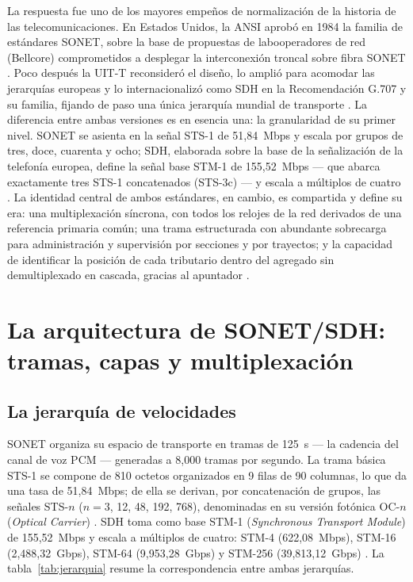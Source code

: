 \documentclass[12pt,a4paper]{article}
\begin{document}
La respuesta fue uno de los mayores empeños de normalización de la historia de las telecomunicaciones. En Estados Unidos, la ANSI aprobó en 1984 la familia de estándares SONET, sobre la base de propuestas de labooperadores de red (Bellcore) comprometidos a desplegar la interconexión troncal sobre fibra SONET \cite{ansi}. Poco después la UIT-T reconsideró el diseño, lo amplió para acomodar las jerarquías europeas y lo internacionalizó como SDH en la Recomendación G.707 y su familia, fijando de paso una única jerarquía mundial de transporte \cite{itug707}. La diferencia entre ambas versiones es en esencia una: la granularidad de su primer nivel. SONET se asienta en la señal STS-1 de 51{,}84~Mbps y escala por grupos de tres, doce, cuarenta y ocho; SDH, elaborada sobre la base de la señalización de la telefonía europea, define la señal base STM-1 de 155{,}52~Mbps --- que abarca exactamente tres STS-1 concatenados (STS-3c) --- y escala a múltiplos de cuatro \cite{itug707, stallings2004}. La identidad central de ambos estándares, en cambio, es compartida y define su era: una multiplexación síncrona, con todos los relojes de la red derivados de una referencia primaria común; una trama estructurada con abundante sobrecarga para administración y supervisión por secciones y por trayectos; y la capacidad de identificar la posición de cada tributario dentro del agregado sin demultiplexado en cascada, gracias al apuntador \cite{itug707, ituG803, tanenbaum2012}.

\section{La arquitectura de SONET/SDH: tramas, capas y multiplexación}

\subsection{La jerarquía de velocidades}

SONET organiza su espacio de transporte en tramas de 125~\textmu s --- la cadencia del canal de voz PCM --- generadas a 8{,}000 tramas por segundo. La trama básica STS-1 se compone de 810 octetos organizados en 9 filas de 90 columnas, lo que da una tasa de 51{,}84~Mbps; de ella se derivan, por concatenación de grupos, las señales STS-$n$ ($n=3$, 12, 48, 192, 768), denominadas en su versión fotónica OC-$n$ (\emph{Optical Carrier}) \cite{ansi, itug707}. SDH toma como base STM-1 (\emph{Synchronous Transport Module}) de 155{,}52~Mbps y escala a múltiplos de cuatro: STM-4 (622{,}08~Mbps), STM-16 (2{,}488{,}32~Gbps), STM-64 (9{,}953{,}28~Gbps) y STM-256 (39{,}813{,}12~Gbps) \cite{itug707}. La tabla~\ref{tab:jerarquia} resume la correspondencia entre ambas jerarquías.
\end{document}
